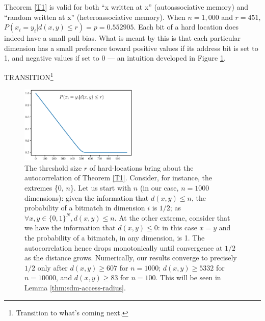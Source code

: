 Theorem \ref{T1} is valid for both ``x written at x'' (autoassociative memory) and ``random written at x'' (heteroassociative memory). When $n=1,000$ and $r=451$, $P(x_i = y_i | d(x, y) \le r) = p = 0.552905$.  Each bit of a hard location does indeed have a small pull bias.  What is meant by this is that each particular dimension has a small preference toward positive values if its address bit is set to 1, and negative values if set to 0 --- an intuition developed in Figure \ref{fig:bitmatchbias}.

TRANSITION\footnote{Transition to what's coming next.}

\begin{figure}[!ht]
\centering

\includegraphics[width=0.5\textwidth]{./images02/autocorrelation/autocorrelation_n=1000_closeview=False.eps}

\caption{The threshold size $r$ of hard-locations bring about the autocorrelation of Theorem \ref{T1}. Consider, for instance, the extremes \{0, $n$\}.  Let us start with $n$ (in our case, $n=1000$ dimensions): given the information that $d(x,y)\le n$, the probability of a bitmatch in dimension $i$ is $1/2$; as $\forall x,y \in \{0, 1\}^N, d(x,y)\le n$. At the other extreme, consider that we have the information that $d(x,y)\le 0$: in this case $x=y$ and the probability of a bitmatch, in any dimension, is 1. The autocorrelation hence drops monotonically until convergence at $1/2$ as the distance grows. Numerically, our results converge to precisely $1/2$ only after $d(x,y)\ge 607$ for $n=1000$; $d(x,y)\ge 5332$ for $n=10000$, and $d(x,y)\ge 83$ for $n=100$. This will be seen in Lemma \ref{thm:sdm-access-radius}.
\label{fig:bitmatchbias}}
\end{figure}

